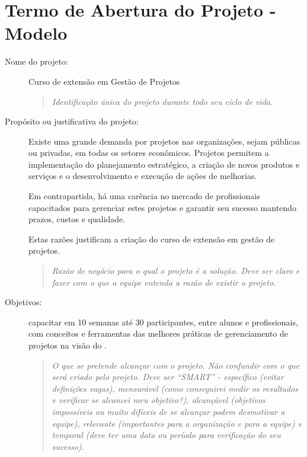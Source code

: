 \appendix
\newpage

\chapter{Termo de Abertura do Projeto - Modelo}

\begin{description}
	
	\item[Nome do projeto:] Curso de extensão em Gestão de Projetos
	
	\begin{quote}
	\emph{Identificação única do projeto durante todo seu ciclo de vida.}	
	\end{quote}
	
	\item[Propósito ou justificativa do projeto:] Existe uma grande demanda por projetos nas organizações, sejam públicas ou privadas, em todas os setores econômicos. Projetos permitem a implementação do planejamento estratégico, a criação de novos produtos e serviços e o desenvolvimento e execução de ações de melhorias.

	Em contrapartida, há uma carência no mercado de profissionais capacitados para gerenciar estes projetos e garantir seu sucesso mantendo prazos, custos e qualidade.

	Estas razões justificam a criação do curso de extensão em gestão de projetos.
	
	\begin{quote}
	\emph{Razão de negócio para o qual o projeto é a solução. Deve ser claro e fazer com o que a equipe entenda a razão de existir o projeto.}
	\end{quote}

	\item[Objetivos:] capacitar em 10 semanas até 30 participantes, entre alunos e profissionais, com conceitos e ferramentas das melhores práticas de gerenciamento de projetos na visão do \pmi.
	
	\begin{quote}
		\emph{O que se pretende alcançar com o projeto. Não confundir com o que será criado pelo projeto. Deve ser ``SMART'' - específico (evitar definições vagas), mensurável (como conseguirei medir os resultados e verificar se alcancei meu objetivo?), alcançável (objetivos impossíveis ou muito difíceis de se alcançar podem desmotivar a equipe), relevante (importantes para a organização e para a equipe) e temporal (deve ter uma data ou período para verificação do seu sucesso).}
	\end{quote}


\end{description}
